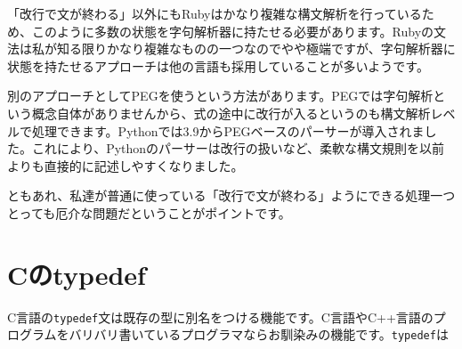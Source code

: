 \begin{Shaded}
\begin{Highlighting}[]
\NormalTok{\};}
\end{Highlighting}
\end{Shaded}

「改行で文が終わる」以外にもRubyはかなり複雑な構文解析を行っているため、このように多数の状態を字句解析器に持たせる必要があります。Rubyの文法は私が知る限りかなり複雑なものの一つなのでやや極端ですが、字句解析器に状態を持たせるアプローチは他の言語も採用していることが多いようです。

別のアプローチとしてPEGを使うという方法があります。PEGでは字句解析という概念自体がありませんから、式の途中に改行が入るというのも構文解析レベルで処理できます。Pythonでは3.9からPEGベースのパーサーが導入されました。これにより、Pythonのパーサーは改行の扱いなど、柔軟な構文規則を以前よりも直接的に記述しやすくなりました。

ともあれ、私達が普通に使っている「改行で文が終わる」ようにできる処理一つとっても厄介な問題だということがポイントです。

\hypertarget{chapter7-cux306etypedef}{%
\section{Cのtypedef}\label{chapter7-cux306etypedef}}

C言語の\texttt{typedef}文は既存の型に別名をつける機能です。C言語やC++言語のプログラムをバリバリ書いているプログラマならお馴染みの機能です。\texttt{typedef}は

